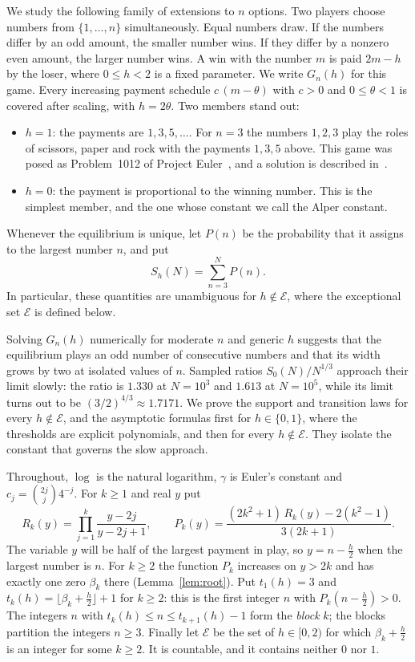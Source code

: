 \documentclass[11pt]{article}
\theoremstyle{definition}
\theoremstyle{remark}
\begin{document}
We study the following family of extensions to $n$ options. Two players
choose numbers from $\{1,\dots,n\}$ simultaneously. Equal numbers draw. If
the numbers differ by an odd amount, the smaller number wins. If they
differ by a nonzero even amount, the larger number wins. A win with the
number $m$ is paid $2m-h$ by the loser, where $0\le h<2$ is a fixed
parameter. We write $G_n(h)$ for this game. Every increasing payment
schedule $c\,(m-\theta)$ with $c>0$ and $0\le\theta<1$ is covered after
scaling, with $h=2\theta$. Two members stand out:
\begin{itemize}
\item $h=1$: the payments are $1,3,5,\dots$. For $n=3$ the numbers
$1,2,3$ play the roles of scissors, paper and rock with the payments
$1,3,5$ above. This game was posed as Problem~1012 of Project
Euler~\cite{PE}, and a solution is described in~\cite{ES}.
\item $h=0$: the payment is proportional to the winning number. This is
the simplest member, and the one whose constant we call the Alper
constant.
\end{itemize}
Whenever the equilibrium is unique, let $P(n)$ be the probability that
it assigns to the largest number $n$, and put
\[
S_h(N)=\sum_{n=3}^{N}P(n).
\]
In particular, these quantities are unambiguous for $h\notin\mathcal E$,
where the exceptional set $\mathcal E$ is defined below.

Solving $G_n(h)$ numerically for moderate $n$ and generic $h$ suggests
that the equilibrium plays an odd number of consecutive numbers and
that its width grows by two at isolated values of $n$. Sampled ratios
$S_0(N)/N^{1/3}$ approach their limit slowly: the ratio is $1.330$ at $N=10^3$ and
$1.613$ at $N=10^5$, while its limit turns out to be
$(3/2)^{4/3}\approx1.7171$. We prove the support and transition laws
for every $h\notin\mathcal E$, and the asymptotic formulas first for
$h\in\{0,1\}$, where the thresholds are explicit polynomials, and then for
every $h\notin\mathcal E$. They isolate the constant that governs the slow
approach.

Throughout, $\log$ is the natural logarithm, $\gamma$ is Euler's
constant and $c_j=\binom{2j}{j}4^{-j}$. For $k\ge1$ and real $y$ put
\begin{equation}\label{eq:R-P}
R_k(y)=\prod_{j=1}^{k}\frac{y-2j}{y-2j+1},\qquad
P_k(y)=\frac{(2k^2+1)\,R_k(y)-2(k^2-1)}{3(2k+1)} .
\end{equation}
The variable $y$ will be half of the largest payment in play, so
$y=n-\frac h2$ when the largest number is $n$. For $k\ge2$ the function
$P_k$ increases on $y>2k$ and has exactly one zero $\beta_k$ there
(Lemma~\ref{lem:root}). Put $t_1(h)=3$ and $t_k(h)=\lfloor\beta_k+\frac
h2\rfloor+1$ for $k\ge2$: this is the first integer $n$ with
$P_k(n-\frac h2)>0$. The integers $n$ with $t_k(h)\le n\le t_{k+1}(h)-1$
form the \emph{block} $k$; the blocks partition the integers $n\ge3$.
Finally let $\mathcal E$ be the set of $h\in[0,2)$ for which
$\beta_k+\frac h2$ is an integer for some $k\ge2$. It is countable, and it
contains neither $0$ nor $1$.
\end{document}
